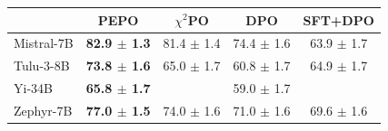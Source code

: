 \small
\begin{tabular}{lcccc}
\toprule
 & PEPO & $\chi^2$PO & DPO & SFT+DPO \\
\midrule
Mistral-7B & \textbf{82.9 $\pm$ 1.3} & 81.4 $\pm$ 1.4 & 74.4 $\pm$ 1.6 & 63.9 $\pm$ 1.7 \\
Tulu-3-8B & \textbf{73.8 $\pm$ 1.6} & 65.0 $\pm$ 1.7 & 60.8 $\pm$ 1.7 & 64.9 $\pm$ 1.7 \\
Yi-34B & \textbf{65.8 $\pm$ 1.7} &  & 59.0 $\pm$ 1.7 &  \\
Zephyr-7B & \textbf{77.0 $\pm$ 1.5} & 74.0 $\pm$ 1.6 & 71.0 $\pm$ 1.6 & 69.6 $\pm$ 1.6 \\
\bottomrule
\end{tabular}
